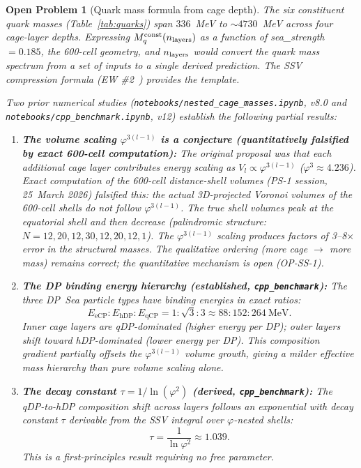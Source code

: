 \documentclass[11pt,letterpaper]{article}
\newtheorem{openprob}[theorem]{Open Problem}
\newcommand{\eCP}{\mathrm{eCP}}
\newcommand{\hDP}{\mathrm{hDP}}
\newcommand{\qCP}{\mathrm{qCP}}
\newcommand{\phig}{\varphi}
\begin{document}
\begin{openprob}[Quark mass formula from cage depth]
\label{op:mq}
The six constituent quark masses (Table~\ref{tab:quarks}) span
$336$~MeV to $\sim 4730$~MeV across four cage-layer depths.
Expressing $M_q^{\rm const}(n_{\rm layers})$ as a function of
sea\_strength $= 0.185$, the 600-cell geometry, and $n_{\rm layers}$
would convert the quark mass spectrum from a set of inputs to a
single derived prediction.  The SSV compression formula (EW
\#2~\citep{cpp_ew2}) provides the template.

Two prior numerical studies (\texttt{notebooks/nested\_cage\_masses.ipynb},
v8.0 and \texttt{notebooks/cpp\_benchmark.ipynb}, v12) establish the
following partial results:

\begin{enumerate}
\item \textbf{The volume scaling $\phig^{3(l-1)}$ is a conjecture
  (quantitatively falsified by exact 600-cell computation):}
  The original proposal was that each additional cage layer
  contributes energy scaling as $V_l \propto \phig^{3(l-1)}$
  ($\phig^3 \approx 4.236$).  Exact computation of the 600-cell
  distance-shell volumes (PS-1 session, 25~March 2026) falsified
  this: the actual 3D-projected Voronoi volumes of the 600-cell
  shells do \emph{not} follow $\phig^{3(l-1)}$.  The true shell
  volumes peak at the equatorial shell and then \emph{decrease}
  (palindromic structure: $N = 12, 20, 12, 30, 12, 20, 12, 1$).
  The $\phig^{3(l-1)}$ scaling produces factors of 3--8$\times$
  error in the structural masses.  The qualitative ordering
  (more cage $\to$ more mass) remains correct; the quantitative
  mechanism is open (OP-SS-1).

\item \textbf{The DP binding energy hierarchy (established,
  \texttt{cpp\_benchmark}):}
  The three DP~Sea particle types have binding energies in exact
  ratios:
  \begin{equation}
  E_{\eCP} : E_{\hDP} : E_{\qCP}
  = 1 : \sqrt{3} : 3
  \approx 88 : 152 : 264\ \text{MeV}.
  \label{eq:dp_energies}
  \end{equation}
  Inner cage layers are qDP-dominated (higher energy per DP);
  outer layers shift toward hDP-dominated (lower energy per DP).
  This composition gradient partially offsets the $\phig^{3(l-1)}$
  volume growth, giving a milder effective mass hierarchy than
  pure volume scaling alone.

\item \textbf{The decay constant $\tau = 1/\ln(\phig^2)$
  (derived, \texttt{cpp\_benchmark}):}
  The qDP-to-hDP composition shift across layers follows an
  exponential with decay constant $\tau$ derivable from the SSV
  integral over $\phig$-nested shells:
  \begin{equation}
  \tau = \frac{1}{\ln \phig^2} \approx 1.039.
  \label{eq:tau}
  \end{equation}
  This is a first-principles result requiring no free parameter.


\end{enumerate}
\end{openprob}
\end{document}
